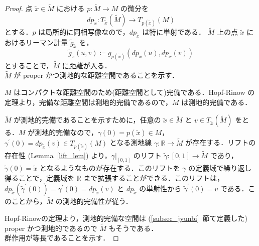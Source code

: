 \documentclass[dvipdfmx]{ujarticle}
\theoremstyle{definition}
\begin{document}
\begin{proof}
点 $\tilde{x}\in\widetilde{M}$ における $p\colon\widetilde{M}\rightarrow M$ の微分を
$$ dp_{\tilde{x}}\colon T_{\tilde{x}}(\widetilde{M})\rightarrow T_{p(\tilde{x})}(M) $$
とする．$p$ は局所的に同相写像なので，$dp_{\tilde{x}}$ は特に単射である． $\widetilde{M}$ 上の点 $\tilde{x}$ におけるリーマン計量 $\tilde{g}_{\tilde{x}}$ を，
$$\tilde{g}_{\tilde{x}}(u,v)\coloneqq g_{p(\tilde{x})}(dp_{\tilde{x}}(u),dp_{\tilde{x}}(v))$$
とすることで，$\widetilde{M}$ に距離が入る．\\

\noindent
$\widetilde{M}$ が proper かつ測地的な距離空間であることを示す．

$M$ はコンパクトな距離空間のため(距離空間として)完備である．Hopf-Rinow の定理より，完備な距離空間は測地的完備であるので，$M$ は測地的完備である．

$\widetilde{M}$ が測地的完備であることを示すために，任意の $\tilde{x}\in\widetilde{M}$ と $v\in T_{\tilde{x}}(\widetilde{M})$ をとる．$M$ が測地的完備なので，$\gamma(0)=p(\tilde{x})\in M$，$\gamma^\prime(0)=dp_{\tilde{x}}(v)\in T_{p(\tilde{x})}(M) $ となる測地線 $\gamma\colon\mathbb{R}\rightarrow \widetilde{M}$ が存在する．リフトの存在性 (Lemma~\ref{lift_lem}) より，$\gamma|_{[0,1]}$ のリフト $\tilde{\gamma}\colon[0,1]\rightarrow \widetilde{M}$ であり，$\tilde{\gamma}(0)=\tilde{x}$ となるようなものが存在する．このリフトを $\gamma$ の定義域で繰り返し得ることで，定義域を $\mathbb{R}$ まで拡張することができる．このリフトは，$dp_{\tilde{x}}(\tilde{\gamma}^\prime(0))=\gamma^\prime(0)=dp_{\tilde{x}}(v)$ と $dp_{\tilde{x}}$ の単射性から $\tilde{\gamma}^\prime(0)=v$ である．このことから，$\widetilde{M}$ の測地的完備性が従う．

Hopf-Rinowの定理より，測地的完備な空間は (\ref{subsec_jyunbi}~節て定義した) proper かつ測地的であるので $\widetilde{M}$ もそうである．\\

\noindent
群作用が等長であることを示す．


\end{proof}
\end{document}
